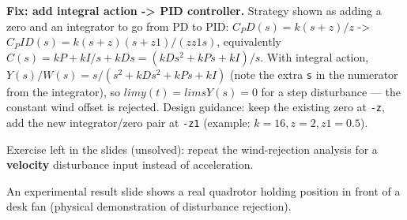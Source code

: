 \documentclass[11pt]{article}
\begin{document}
\textbf{Fix: add integral action -> PID controller.} Strategy shown as adding a zero and an integrator to go from PD to PID:
$C_PD(s) = k (s+z)/z$ -> $C_PID(s) = k (s+z)(s+z1) / (z z1 s)$, equivalently $C(s) = kP + kI/s + kD s = (kD s^2 + kP s + kI)/s$.
With integral action, $Y(s)/W(s) = s / (s^2 + kD s^2 + kP s + kI)$ (note the extra \texttt{s} in the numerator from the integrator), so $lim y(t) = lim s Y(s) = 0$ for a step disturbance — the constant wind offset is rejected. Design guidance: keep the existing zero at \texttt{-z}, add the new integrator/zero pair at \texttt{-z1} (example: $k=16, z=2, z1=0.5$).

Exercise left in the slides (unsolved): repeat the wind-rejection analysis for a \textbf{velocity} disturbance input instead of acceleration.

An experimental result slide shows a real quadrotor holding position in front of a desk fan (physical demonstration of disturbance rejection).
\end{document}
